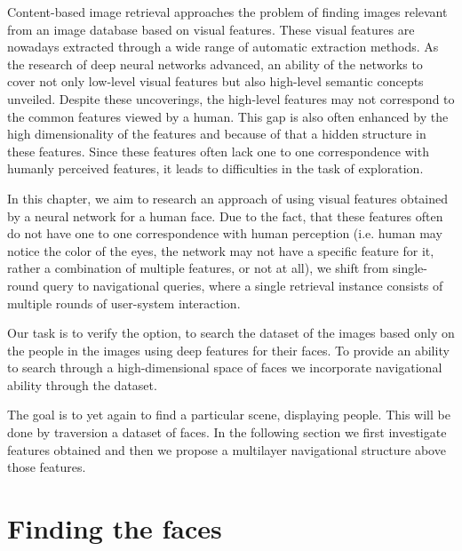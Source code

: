Content-based image retrieval approaches the problem of finding images relevant from an image database based on visual features. These visual features are nowadays extracted through a wide range of automatic extraction methods. As the research of deep neural networks advanced, an ability of the networks to cover not only low-level visual features but also high-level semantic concepts unveiled. Despite these uncoverings, the high-level features may not correspond to the common features viewed by a human. This gap is also often enhanced by the high dimensionality of the features and because of that a hidden structure in these features. Since these features often lack one to one correspondence with humanly perceived features, it leads to difficulties in the task of exploration.

In this chapter, we aim to research an approach of using visual features obtained by a neural network for a human face. Due to the fact, that these features often do not have one to one correspondence with human perception (i.e. human may notice the color of the eyes, the network may not have a specific feature for it, rather a combination of multiple features, or not at all), we shift from single-round query to navigational queries, where a single retrieval instance consists of multiple rounds of user-system interaction.

Our task is to verify the option, to search the dataset of the images based only on the people in the images using deep features for their faces. To provide an ability to search through a high-dimensional space of faces we incorporate navigational ability through the dataset.

The goal is to yet again to find a particular scene, displaying people. This will be done by traversion a dataset of faces. In the following section we first investigate features obtained and then we propose a multilayer navigational structure above those features.

\section{Finding the faces}


